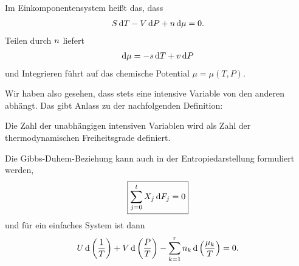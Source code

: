 Im Einkomponentensystem heißt das, dass
\begin{align*}
    S\mathop{}\!\mathrm{d} T - V\mathop{}\!\mathrm{d} P + n \mathop{}\!\mathrm{d} \mu = 0.
\end{align*}
Teilen durch $n$ liefert
\begin{align*}
    \mathop{}\!\mathrm{d} \mu = -s \mathop{}\!\mathrm{d} T + v\mathop{}\!\mathrm{d} P
\end{align*}
und Integrieren führt auf das chemische Potential $\mu=\mu(T,P)$.

Wir haben also gesehen, dass stets eine intensive Variable von den anderen abhängt. Das gibt Anlass zu der nachfolgenden Definition:
\begin{formal}
    Die Zahl der unabhängigen intensiven Variablen wird als Zahl der thermodynamischen Freiheitsgrade definiert.
\end{formal}

Die Gibbs-Duhem-Beziehung kann auch in der Entropiedarstellung formuliert werden,
\begin{align*}
    \boxed{\sum_{j=0}^t X_j \mathop{}\!\mathrm{d} F_j = 0}
\end{align*}
und für ein einfaches System ist dann
\begin{align*}
    U\mathop{}\!\mathrm{d}\left(\frac{1}{T}\right) + V\mathop{}\!\mathrm{d}\left(\frac{P}{T}\right)-\sum_{k=1}^r n_k\mathop{}\!\mathrm{d}\left(\frac{\mu_k}{T}\right)=0.
\end{align*}
